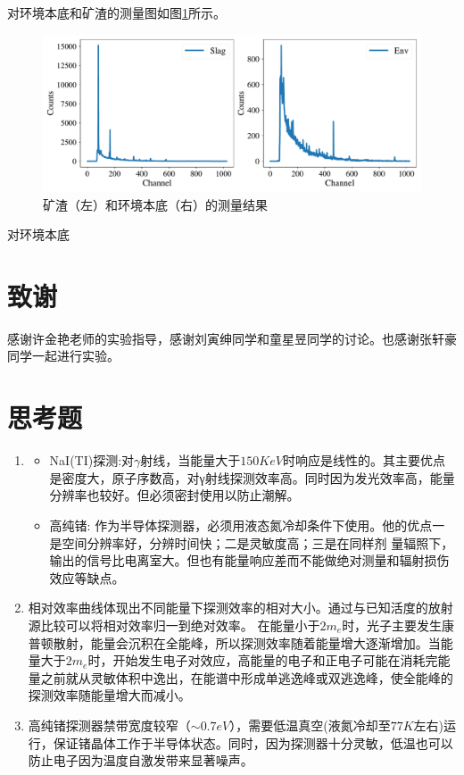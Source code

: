 \documentclass{article}
\begin{document}
    对环境本底和矿渣的测量图如图\ref{fig:slag_vs_env}所示。
    \begin{figure}
        \centering
        \includegraphics[width=\textwidth]{../plots/slag_vs_env.pdf}
        \caption{矿渣（左）和环境本底（右）的测量结果\label{fig:slag_vs_env}}
    \end{figure}
    对环境本底
\section{致谢}
    感谢许金艳老师的实验指导，感谢刘寅绅同学和童星昱同学的讨论。也感谢张轩豪同学一起进行实验。
    \clearpage
    \appendix
    \appendixpage
    \section{思考题}
    \begin{enumerate}
        \item \begin{itemize}
            \item NaI(TI)探测:对$\gamma$射线，当能量大于$150\si{KeV}$时响应是线性的。其主要优点是密度大，原子序数高，对γ射线探测效率高。同时因为发光效率高，能量分辨率也较好。但必须密封使用以防止潮解。
            \item 高纯锗: 作为半导体探测器，必须用液态氮冷却条件下使用。他的优点一是空间分辨率好，分辨时间快；二是灵敏度高；三是在同样剂 量辐照下，输出的信号比电离室大。但也有能量响应差而不能做绝对测量和辐射损伤效应等缺点。
        \end{itemize}
        \item 相对效率曲线体现出不同能量下探测效率的相对大小。通过与已知活度的放射源比较可以将相对效率归一到绝对效率。
        在能量小于$2m_{e}$时，光子主要发生康普顿散射，能量会沉积在全能峰，所以探测效率随着能量增大逐渐增加。当能量大于$2m_{e}$时，开始发生电子对效应，高能量的电子和正电子可能在消耗完能量之前就从灵敏体积中逸出，在能谱中形成单逃逸峰或双逃逸峰，使全能峰的探测效率随能量增大而减小。
        \item 高纯锗探测器禁带宽度较窄（$\sim 0.7\si{eV}$），需要低温真空(液氮冷却至$77\si{K}$左右)运
        行，保证锗晶体工作于半导体状态。同时，因为探测器十分灵敏，低温也可以防止电子因为温度自激发带来显著噪声。 
    \end{enumerate}
\end{document}
